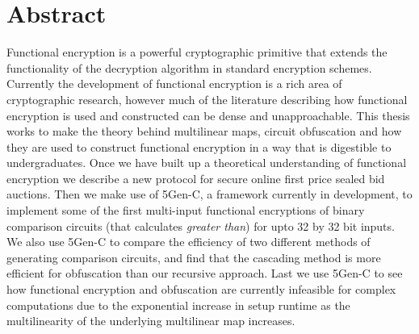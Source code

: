 \documentclass[12pt,twoside]{reedthesis}
\begin{document}
    \chapter*{Abstract}
	Functional encryption is a powerful cryptographic primitive that extends the functionality of the decryption algorithm in standard encryption schemes. Currently the development of functional encryption is a rich area of cryptographic research, however much of the literature describing how functional encryption is used and constructed can be dense and unapproachable. This thesis works to make the theory behind multilinear maps, circuit obfuscation and how they are used to construct functional encryption in a way that is digestible to undergraduates. Once we have built up a theoretical understanding of functional encryption we describe a new protocol for secure online first price sealed bid auctions. Then we make use of 5Gen-C, a framework currently in development, to implement some of the first multi-input functional encryptions of binary comparison circuits (that calculates \textit{greater than}) for upto 32 by 32 bit inputs. We also use 5Gen-C to compare the efficiency of two different methods of generating comparison circuits, and find that the cascading method is more efficient for obfuscation than our recursive approach. Last we use 5Gen-C to see how functional encryption and obfuscation are currently infeasible for complex computations due to the exponential increase in setup runtime as the multilinearity of the underlying multilinear map increases.
	

    \tableofcontents
    
 
  \mainmatter %
  \pagestyle{fancyplain} %
    
\end{document}
